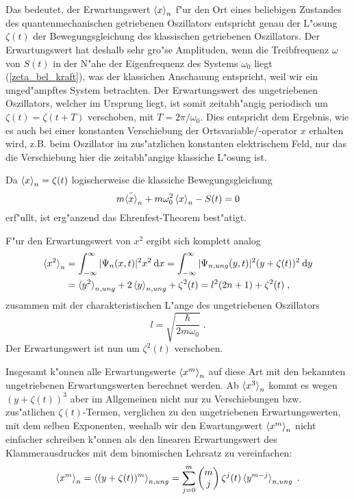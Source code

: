     Das bedeutet, der Erwartungswert $\braket{x}_n$ f"ur den Ort eines beliebigen Zustandes des quantenmechanischen getriebenen Oszillators entspricht genau der L"osung $\zeta(t)$ der Bewegungsgleichung des klassischen getriebenen Oszillators.
    Der Erwartungswert hat deshalb sehr gro"se Amplituden, wenn die Treibfrequenz $\omega$ von $S(t)$ in der N"ahe der Eigenfrequenz des Systems $\omega_0$ liegt (\ref{zeta_bel_kraft}), was der klassichen Anschauung entspricht, weil wir ein unged"ampftes System betrachten.
    Der Erwartungswert des ungetriebenen Oszillators, welcher im Ursprung liegt, ist somit zeitabh"angig periodisch um $\zeta(t)=\zeta(t+T)$ verschoben, mit $T=2\pi/\omega_0$.
    Dies entspricht dem Ergebnis, wie es auch bei einer konstanten Verschiebung der Ortsvariable/-operator $x$ erhalten wird, z.B. beim Oszillator im zus"atzlichen konstanten elektrischem Feld, nur das die Verschiebung hier die zeitabh"angige klassiche L"osung ist.

    Da $\braket{x}_n=\zeta(t)$ logischerweise die klassiche Bewegungsgleichung
    \begin{equation}
      m\ddot{\braket{x}}_n + m\omega_0^2\braket{x}_n - S(t) = 0
    \end{equation}
    erf"ullt, ist erg"anzend das Ehrenfest-Theorem best"atigt.

    F"ur den Erwartungswert von $x^2$ ergibt sich komplett analog
    \begin{align}
      \braket{x^2}_n &= \int_{-\infty}^{\infty} |\Psi_n(x,t)|^2 x^2 \: \text dx
      = \int_{-\infty}^{\infty} |\Psi_{n,ung}(y,t)|^2 (y+\zeta(t))^2 \: \text dy \notag \\
      &= \braket{y^2}_{n,ung} + 2\braket{y}_{n,ung} + \zeta^2(t)
      = l^2(2n+1) + \zeta^2(t) \; ,
    \end{align}
    zusammen mit der charakteristischen L"ange des ungetriebenen Oszillators
    \begin{equation}
      l = \sqrt{\frac{\hbar}{2m\omega_0}} \; .
    \end{equation}
    Der Erwartungswert ist nun um $\zeta^2(t)$ verschoben.

    Insgesamt k"onnen alle Erwartungswerte $\braket{x^m}_n$ auf diese Art mit den bekannten ungetriebenen Erwartungswerten berechnet werden.
    Ab $\braket{x^3}_n$ kommt es wegen $(y+\zeta(t))^3$ aber im Allgemeinen nicht nur zu Verschiebungen bzw. zus"atlichen $\zeta(t)$-Termen, verglichen zu den ungetriebenen Erwartungswerten, mit dem selben Exponenten, weshalb wir den Ewartungswert $\braket{x^m}_n$ nicht einfacher schreiben k"onnen als den linearen Erwartungswert des Klammerausdruckes mit dem binomischen Lehrsatz \cite{binom} zu vereinfachen:
    \begin{equation}
      \braket{x^m}_n = \braket{(y+\zeta(t))^m}_{n,ung} = \sum_{j=0}^m \begin{pmatrix} m \\ j \\ \end{pmatrix} \zeta^j(t)\braket{y^{m-j}}_{n,ung} \; .
    \end{equation}





